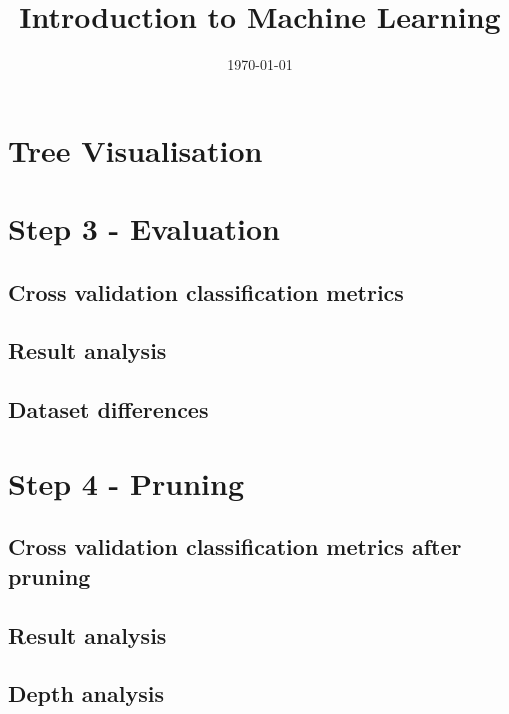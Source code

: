 \documentclass[12pt]{article}
\begin{document}
\title{Introduction to Machine Learning}
\date{\today}
\maketitle
\section*{Tree Visualisation}
\section*{Step 3 - Evaluation}
  \subsection*{Cross validation classification metrics}
  \subsection*{Result analysis}
  \subsection*{Dataset differences}
\section*{Step 4 - Pruning}
  \subsection*{Cross validation classification metrics after pruning}
  \subsection*{Result analysis}
  \subsection*{Depth analysis}
\end{document}
